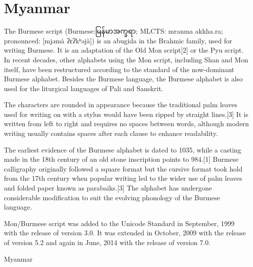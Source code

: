\section{Myanmar}
\newfontfamily{}

The Burmese script (Burmese:{\myanmar မြန်မာအက္ခရာ}; MLCTS: mranma akkha.ra; pronounced: [mjəmà ʔɛʔkʰəjà]) is an abugida in the Brahmic family, used for writing Burmese. It is an adaptation of the Old Mon script[2] or the Pyu script. In recent decades, other alphabets using the Mon script, including Shan and Mon itself, have been restructured according to the standard of the now-dominant Burmese alphabet. Besides the Burmese language, the Burmese alphabet is also used for the liturgical languages of Pali and Sanskrit.

The characters are rounded in appearance because the traditional palm leaves used for writing on with a stylus would have been ripped by straight lines.[3] It is written from left to right and requires no spaces between words, although modern writing usually contains spaces after each clause to enhance readability.

The earliest evidence of the Burmese alphabet is dated to 1035, while a casting made in the 18th century of an old stone inscription points to 984.[1] Burmese calligraphy originally followed a square format but the cursive format took hold from the 17th century when popular writing led to the wider use of palm leaves and folded paper known as parabaiks.[3] The alphabet has undergone considerable modification to suit the evolving phonology of the Burmese language.

Mon/Burmese script was added to the Unicode Standard in September, 1999 with the release of version 3.0. It was extended in October, 2009 with the release of version 5.2 and again in June, 2014 with the release of version 7.0.

\begin{scriptexample}[]{Myanmar}
\end{scriptexample}






